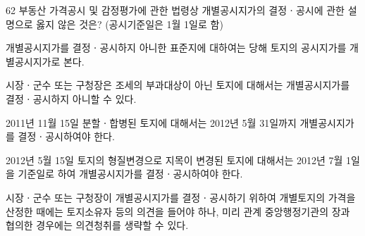 \begin{question}{62}
부동산 가격공시 및 감정평가에 관한 법령상 개별공시지가의 결정ㆍ공시에 관한 설명으로 옳지 않은 것은? (공시기준일은 1월 1일로 함)
\begin{choices}
  \item 개별공시지가를 결정ㆍ공시하지 아니한 표준지에 대하여는 당해 토지의 공시지가를 개별공시지가로 본다.
  \item 시장ㆍ군수 또는 구청장은 조세의 부과대상이 아닌 토지에 대해서는 개별공시지가를 결정ㆍ공시하지 아니할 수 있다.
  \item 2011년 11월 15일 분할ㆍ합병된 토지에 대해서는 2012년 5월 31일까지 개별공시지가를 결정ㆍ공시하여야 한다.
  \item 2012년 5월 15일 토지의 형질변경으로 지목이 변경된 토지에 대해서는 2012년 7월 1일을 기준일로 하여 개별공시지가를 결정ㆍ공시하여야 한다.
  \item 시장ㆍ군수 또는 구청장이 개별공시지가를 결정ㆍ공시하기 위하여 개별토지의 가격을 산정한 때에는 토지소유자 등의 의견을 들어야 하나, 미리 관계 중앙행정기관의 장과 협의한 경우에는 의견청취를 생략할 수 있다.
\end{choices}
\end{question}
